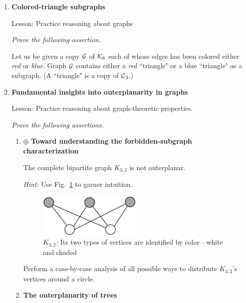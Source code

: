 \begin{enumerate}
\medskip\item
{\bf Colored-triangle subgraphs}

{\sc Lesson:} Practice reasoning about graphs

\smallskip

{\em Prove the following assertion.}

\begin{prop}
Let us be given a copy $\mbox{$\cal G$}$ of $\mbox{$\cal K$}_6$ each of whose edges has been colored either {\em red} or {\em blue}.  Graph $\mbox{$\cal G$}$ contains either a {\em red} ``triangle" or a blue ``triangle" as a subgraph.  (A ``triangle" is a copy of $\mbox{$\cal C$}_3$.)
\end{prop}

\medskip\item
{\bf Fundamental insights into outerplanarity in graphs}

{\sc Lesson:} Practice reasoning about graph-theoretic properties.

\smallskip

{\em Prove the following assertions.}

  \begin{enumerate}
  \item
$\oplus$
{\bf Toward understanding the forbidden-subgraph characterization}

\begin{prop}
The complete bipartite graph $K_{3,2}$ is not outerplanar.
\end{prop}

\smallskip

{\em Hint:} Use Fig.~\ref{fig:K32} to garner intuition.
\begin{figure}[h]
\begin{center}
        \includegraphics[scale=0.35]{FiguresGraph/outerplanarK3,2init} 
\caption{$K_{3,2}$: Its two types of vertices are identified by color---white and shaded}
\label{fig:K32}
\end{center}
\end{figure}
Perform a case-by-case analysis of all possible ways to distribute $K_{3,2}$'s vertices around a circle.

  \medskip\item
{\bf The outerplanarity of trees}

\smallskip


\end{enumerate}
\end{enumerate}
